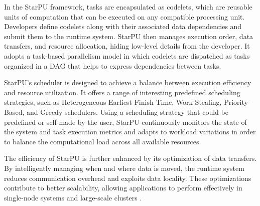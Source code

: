 In the StarPU framework, tasks are encapsulated as codelets, which are reusable units of computation that can be executed on any compatible processing unit. Developers define codelets along with their associated data dependencies and submit them to the runtime system. StarPU then manages execution order, data transfers, and resource allocation, hiding low-level details from the developer. It adopts a task-based parallelism model in which codelets are dispatched as tasks organized in a DAG that helps to express dependencies between tasks. 


StarPU's scheduler is designed to achieve a balance between execution efficiency and resource utilization. It offers a range of interesting predefined scheduling strategies, such as Heterogeneous Earliest Finish Time, Work Stealing, Priority-Based, and Greedy schedulers. Using a scheduling strategy that could be predefined or self-made by the user, StarPU continuously monitors the state of the system and task execution metrics and adapts to workload variations in order to balance the computational load across all available resources. 

The efficiency of StarPU is further enhanced by its optimization of data transfers. By intelligently managing when and where data is moved, the runtime system reduces communication overhead and exploits data locality. These optimizations contribute to better scalability, allowing applications to perform effectively in single-node systems and large-scale clusters \cite{thibault2018}.





%
%


